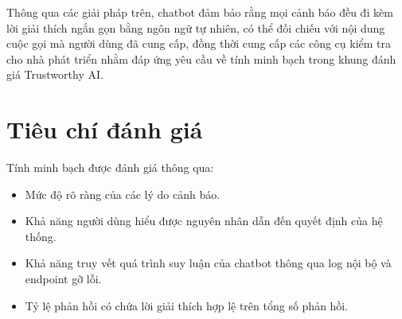 Thông qua các giải pháp trên, chatbot đảm bảo rằng mọi cảnh báo đều đi kèm lời giải thích ngắn gọn bằng ngôn ngữ tự nhiên, có thể đối chiếu với nội dung cuộc gọi mà người dùng đã cung cấp, đồng thời cung cấp các công cụ kiểm tra cho nhà phát triển nhằm đáp ứng yêu cầu về tính minh bạch trong khung đánh giá Trustworthy AI.

\section{Tiêu chí đánh giá}
Tính minh bạch được đánh giá thông qua: 
\begin{itemize}
    \item Mức độ rõ ràng của các lý do cảnh báo.
    \item Khả năng người dùng hiểu được nguyên nhân dẫn đến quyết định của hệ thống.
    \item Khả năng truy vết quá trình suy luận của chatbot thông qua log nội bộ và endpoint gỡ lỗi.
    \item Tỷ lệ phản hồi có chứa lời giải thích hợp lệ trên tổng số phản hồi.
\end{itemize}
